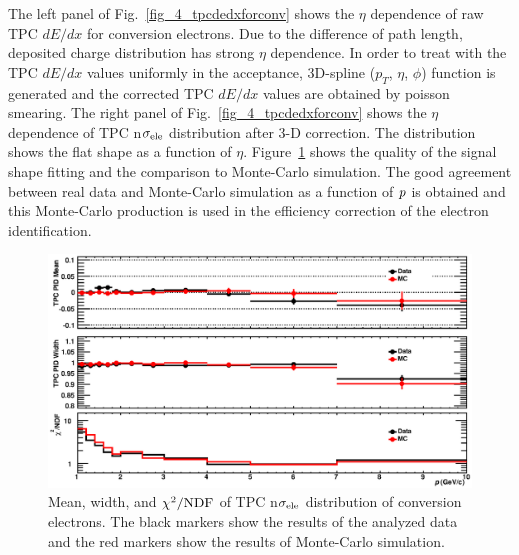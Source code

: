 {The left panel of Fig.~\ref{fig_4_tpcdedxforconv} shows the $\eta$ dependence of raw TPC $dE/dx$ for conversion electrons. 
Due to the difference of path length, deposited charge distribution has strong $\eta$ dependence. 
In order to treat with the TPC $dE/dx$ values uniformly in the acceptance, 3D-spline ($p_{T}$, $\eta$, $\phi$) function is generated and the corrected TPC $dE/dx$ values are obtained by poisson smearing. 
The right panel of Fig.~\ref{fig_4_tpcdedxforconv} shows the $\eta$ dependence of TPC n$\sigma_{\rm{ele}}$ distribution after 3-D correction.  
The distribution shows the flat shape as a function of $\eta$.  
Figure~\ref{fig_4_tpc_pidfit} shows the quality of the signal shape fitting and the comparison to Monte-Carlo simulation. 
The good agreement between real data and Monte-Carlo simulation as a function of $\it{p}$ is obtained and this Monte-Carlo production is used in the efficiency correction of the electron identification.  
\begin{figure}[!h]
  \centering
  \includegraphics[width=12cm]{chap4/figure/PID/ConvFit_AddEtaCorr_MB.eps}
  \caption{Mean, width, and $\chi^{2}/\rm{NDF}$ of TPC n$\sigma_{\rm{ele}}$ distribution of conversion electrons. The black markers show the results of the analyzed data and the red markers show the results of Monte-Carlo simulation.}
  \label{fig_4_tpc_pidfit}
\end{figure}


}
